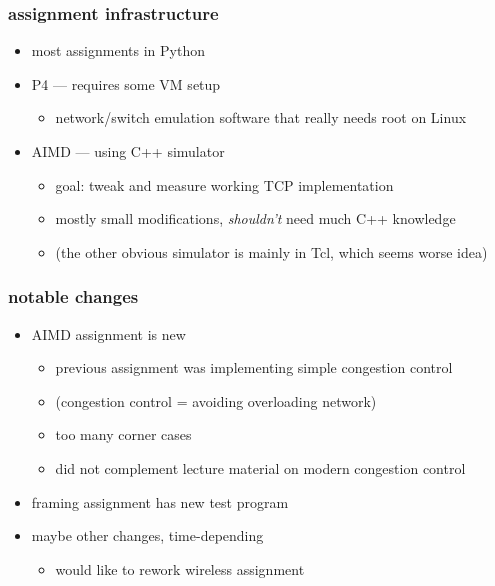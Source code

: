 \begin{frame}\frametitle{assignment infrastructure}
    \begin{itemize}
    \item most assignments in Python
    \item P4 --- requires some VM setup
        \begin{itemize}
        \item network/switch emulation software that really needs root on Linux
        \end{itemize}
    \item AIMD --- using C++ simulator
        \begin{itemize}
        \item goal: tweak and measure working TCP implementation
        \item mostly small modifications, \textit{shouldn't} need much C++ knowledge
        \item (the other obvious simulator is mainly in Tcl, which seems worse idea)
        \end{itemize}
    \end{itemize}
\end{frame}

\begin{frame}\frametitle{notable changes}
    \begin{itemize}
    \item AIMD assignment is new
        \begin{itemize}
        \item previous assignment was implementing simple congestion control
        \item (congestion control = avoiding overloading network)
        \item too many corner cases
        \item did not complement lecture material on modern congestion control
        \end{itemize}
    \item framing assignment has new test program
    \item maybe other changes, time-depending
        \begin{itemize}
        \item would like to rework wireless assignment
        \end{itemize}
    \end{itemize}
\end{frame}

